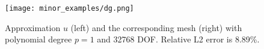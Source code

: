 \begin{figure}[H]
\begin{center}
\texttt{[image: minor\_examples/dg.png]}
\caption{Approximation $u$ (left) and the corresponding mesh (right) with polynomial degree $p = 1$ and 32768 DOF. Relative L2 error is 8.89\%.}
\label{fig:DG_2}
\end{center}
\end{figure}
